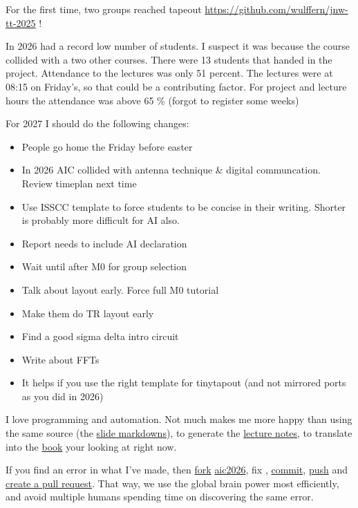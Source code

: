 For the first time, two groups reached tapeout
\url{https://github.com/wulffern/jnw-tt-2025} !

In 2026 had a record low number of students. I suspect it was because
the course collided with a two other courses. There were 13 students
that handed in the project. Attendance to the lectures was only 51
percent. The lectures were at 08:15 on Friday's, so that could be a
contributing factor. For project and lecture hours the attendance was
above 65 \% (forgot to register some weeks)

For 2027 I should do the following changes:

\begin{itemize}
\tightlist
\item[$\square$]
  People go home the Friday before easter
\item[$\square$]
  In 2026 AIC collided with antenna technique \& digital communcation.
  Review timeplan next time
\item[$\square$]
  Use ISSCC template to force students to be concise in their writing.
  Shorter is probably more difficult for AI also.
\item[$\square$]
  Report needs to include AI declaration
\item[$\square$]
  Wait until after M0 for group selection
\item[$\square$]
  Talk about layout early. Force full M0 tutorial
\item[$\square$]
  Make them do TR layout early
\item[$\square$]
  Find a good sigma delta intro circuit
\item[$\square$]
  Write about FFTs
\item[$\square$]
  It helps if you use the right template for tinytapout (and not
  mirrored ports as you did in 2026)
\end{itemize}

I love programming and automation. Not much makes me more happy than
using the same source (the
\href{https://github.com/wulffern/aic2026/tree/main/lectures}{slide
markdowns}), to generate the
\href{https://analogicus.com/aic2026/}{lecture notes}, to translate into
the \href{https://analogicus.com/aic2026/assets/aic.pdf}{book} your
looking at right now.

If you find an error in what I've made, then
\href{https://docs.github.com/en/get-started/quickstart/fork-a-repo}{fork}
\href{https://github.com/wulffern/aic2026}{aic2026}, fix ,
\href{https://git-scm.com/docs/git-commit}{commit},
\href{https://git-scm.com/docs/git-push}{push} and
\href{https://docs.github.com/en/desktop/contributing-and-collaborating-using-github-desktop/working-with-your-remote-repository-on-github-or-github-enterprise/creating-an-issue-or-pull-request}{create
a pull request}. That way, we use the global brain power most
efficiently, and avoid multiple humans spending time on discovering the
same error.
